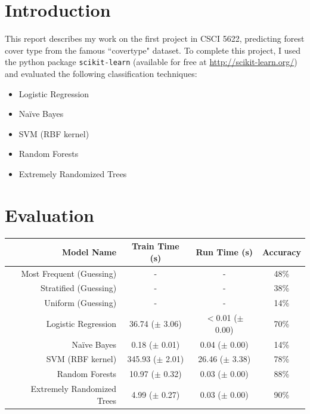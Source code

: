 \documentclass[letter,12pt]{report}
\begin{document}

\section*{Introduction} 
This report describes my work on the first project in CSCI 5622, predicting forest cover type from the famous ``covertype" dataset.  To complete this project, I used the python package \verb!scikit-learn! (available for free at \url{http://scikit-learn.org/}) and evaluated the following classification techniques:

\begin{itemize}
  \item Logistic Regression
  \item Na{\"i}ve Bayes
  \item SVM (RBF kernel)
  \item Random Forests
  \item Extremely Randomized Trees
\end{itemize}

\section*{Evaluation}

\begin{center}
	\begin{tabular}{ | r | c | c | c | }
    \hline
    Model Name & Train Time (s) & Run Time (s) & Accuracy \\ \hline \hline
    Most Frequent (Guessing) & - & - & 48\%  \\ \hline
    Stratified (Guessing) & - & - & 38\% \\ \hline
    Uniform (Guessing) & - & - & 14\% \\ \hline 
	Logistic Regression & 36.74 ($\pm$ 3.06) & $<$0.01 ($\pm$ 0.00) & 70\% \\ \hline 
	Na{\"i}ve Bayes & 0.18 ($\pm$ 0.01) & 0.04 ($\pm$ 0.00) & 14\% \\ \hline
    SVM (RBF kernel) & 345.93 ($\pm$ 2.01) & 26.46 ($\pm$ 3.38) & 78\%  \\ \hline
	Random Forests & 10.97 ($\pm$ 0.32) & 0.03 ($\pm$ 0.00) & 88\%  \\ \hline
	Extremely Randomized Trees & 4.99 ($\pm$ 0.27) & 0.03 ($\pm$ 0.00) & 90\% \\ \hline
    \end{tabular}
\end{center} 
\vspace{0.2cm}
\end{document}
